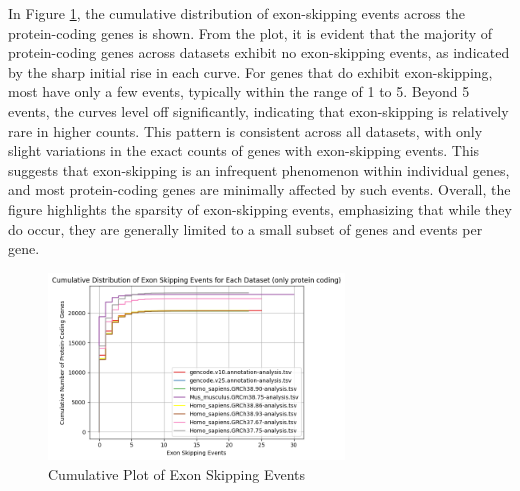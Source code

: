 \documentclass{article}
\begin{document}
    In Figure \ref{fig:cum-exon-skips}, the cumulative distribution of exon-skipping events across the protein-coding genes is shown. From the plot, it is evident that the majority of protein-coding genes across datasets exhibit no exon-skipping events, as indicated by the sharp initial rise in each curve. For genes that do exhibit exon-skipping, most have only a few events, typically within the range of 1 to 5. Beyond 5 events, the curves level off significantly, indicating that exon-skipping is relatively rare in higher counts. This pattern is consistent across all datasets, with only slight variations in the exact counts of genes with exon-skipping events. This suggests that exon-skipping is an infrequent phenomenon within individual genes, and most protein-coding genes are minimally affected by such events. Overall, the figure highlights the sparsity of exon-skipping events, emphasizing that while they do occur, they are generally limited to a small subset of genes and events per gene.



    \begin{figure}
        \centering
        \includegraphics[width=0.7\textwidth]{figures/exonskipping/cumulative_exon_skipping_events}
        \caption{Cumulative Plot of Exon Skipping Events}
        \label{fig:cum-exon-skips}
    \end{figure}




\end{document}
